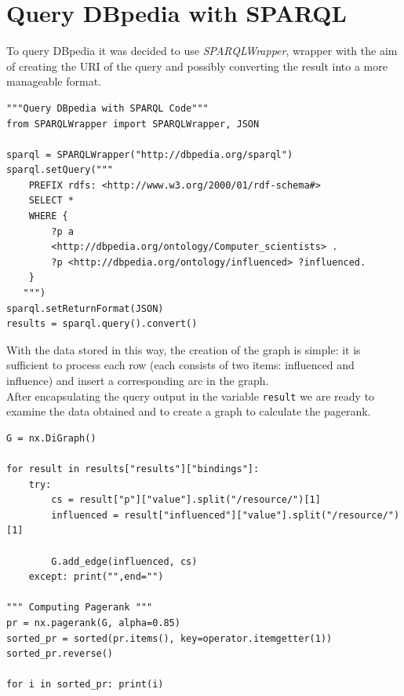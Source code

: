 \documentclass[12pt, twoside]{article}
\begin{document}
\section{Query DBpedia with SPARQL}
To query DBpedia it was decided to use \textit{SPARQLWrapper}, wrapper with the aim of creating the URI of the query and possibly converting the result into a more manageable format.
\vspace{6pt}
\begin{lstlisting}[caption={Query DBpedia},captionpos=b,language=iPython]
"""Query DBpedia with SPARQL Code"""
from SPARQLWrapper import SPARQLWrapper, JSON

sparql = SPARQLWrapper("http://dbpedia.org/sparql")
sparql.setQuery("""
	PREFIX rdfs: <http://www.w3.org/2000/01/rdf-schema#>
	SELECT *
	WHERE {
		?p a
		<http://dbpedia.org/ontology/Computer_scientists> .
		?p <http://dbpedia.org/ontology/influenced> ?influenced.
	}
   """)
sparql.setReturnFormat(JSON)
results = sparql.query().convert()
\end{lstlisting}
With the data stored in this way, the creation of the graph is simple: it is sufficient to process each row (each consists of two items: influenced and influence) and insert a corresponding arc in the graph. \\
After encapsulating the query output in the variable \lstinline[language = iPython]{result} we are ready to examine the data obtained and to create a graph to calculate the pagerank.
\vspace{6pt}

\begin{lstlisting}[caption={Computing Pagerank},captionpos=b,firstnumber=35,language=iPython]
G = nx.DiGraph()

for result in results["results"]["bindings"]:
	try:
		cs = result["p"]["value"].split("/resource/")[1]
		influenced = result["influenced"]["value"].split("/resource/")[1]
		
		G.add_edge(influenced, cs)
	except:	print("",end="")

""" Computing Pagerank """
pr = nx.pagerank(G, alpha=0.85)
sorted_pr = sorted(pr.items(), key=operator.itemgetter(1))
sorted_pr.reverse()

for i in sorted_pr:	print(i)
\end{lstlisting}
\end{document}
